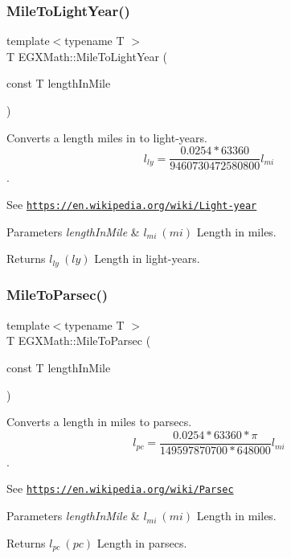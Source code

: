 \subsubsection{\texorpdfstring{Mile\+To\+Light\+Year()}{MileToLightYear()}}
{\footnotesize\ttfamily template$<$typename T $>$ \\
T E\+G\+X\+Math\+::\+Mile\+To\+Light\+Year (\begin{DoxyParamCaption}\item[{const T}]{length\+In\+Mile }\end{DoxyParamCaption})}



Converts a length miles in to light-\/years. \[ l_{ly}=\frac{0.0254 * 63360}{9460730472580800} l_{mi} \]. 

See \href{https://en.wikipedia.org/wiki/Light-year}{\tt https\+://en.\+wikipedia.\+org/wiki/\+Light-\/year} 
\begin{DoxyParams}{Parameters}
{\em length\+In\+Mile} & $ l_{mi}\ (mi)$ Length in miles. \\
\hline
\end{DoxyParams}
\begin{DoxyReturn}{Returns}
$ l_{ly}\ (ly)$ Length in light-\/years. 
\end{DoxyReturn}
\mbox{\label{group___e_g_x_math-_conversions-_length_conversions-_imperial-_mile-_astronomical_ga0f9493a3ad61ed0ddfa411b3f8edf6dc}} 
\subsubsection{\texorpdfstring{Mile\+To\+Parsec()}{MileToParsec()}}
{\footnotesize\ttfamily template$<$typename T $>$ \\
T E\+G\+X\+Math\+::\+Mile\+To\+Parsec (\begin{DoxyParamCaption}\item[{const T}]{length\+In\+Mile }\end{DoxyParamCaption})}



Converts a length in miles to parsecs. \[ l_{pc}=\frac{0.0254 * 63360 * \pi}{149597870700 * 648000} l_{mi} \]. 

See \href{https://en.wikipedia.org/wiki/Parsec}{\tt https\+://en.\+wikipedia.\+org/wiki/\+Parsec} 
\begin{DoxyParams}{Parameters}
{\em length\+In\+Mile} & $ l_{mi}\ (mi)$ Length in miles. \\
\hline
\end{DoxyParams}
\begin{DoxyReturn}{Returns}
$ l_{pc}\ (pc)$ Length in parsecs. 
\end{DoxyReturn}
